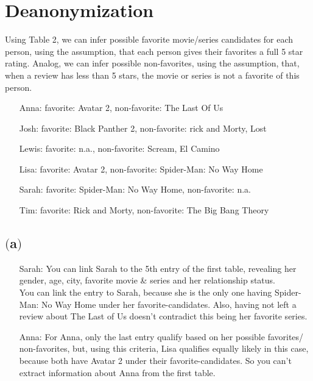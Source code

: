 



\section{Deanonymization}	

Using Table 2, we can infer possible favorite movie/series candidates for each person, using the assumption, that each person gives their favorites a full 5 star rating. Analog, we can infer possible non-favorites, using the assumption, that, when a review has less than 5 stars, the movie or series is not a favorite of this person.

\begin{itemize}
	\item[Anna:] favorite: Avatar 2, non-favorite: The Last Of Us
	\item[Josh:] favorite: Black Panther 2, non-favorite: rick and Morty, Lost
	\item[Lewis:] favorite: n.a., non-favorite: Scream, El Camino
	\item[Lisa:] favorite: Avatar 2, non-favorite: Spider-Man: No Way Home
	\item[Sarah:] favorite: Spider-Man: No Way Home, non-favorite: n.a.
	\item[Tim:] favorite: Rick and Morty, non-favorite: The Big Bang Theory
\end{itemize}

\subsection{$($a$)$}

\begin{itemize}
	\item[Sarah:] You can link Sarah to the 5th entry of the first table, revealing her gender, age, city, favorite movie \& series and her relationship status. \\
	You can link the entry to Sarah, because she is the only one having Spider-Man: No Way Home under her favorite-candidates. Also, having not left a review about The Last of Us doesn't contradict this being her favorite series.
	\item[Anna:] For Anna, only the last entry qualify based on her possible favorites/ non-favorites, but, using this criteria, Lisa qualifies equally likely in this case, because both have Avatar 2 under their favorite-candidates. So you can't extract information about Anna from the first table.
\end{itemize}

